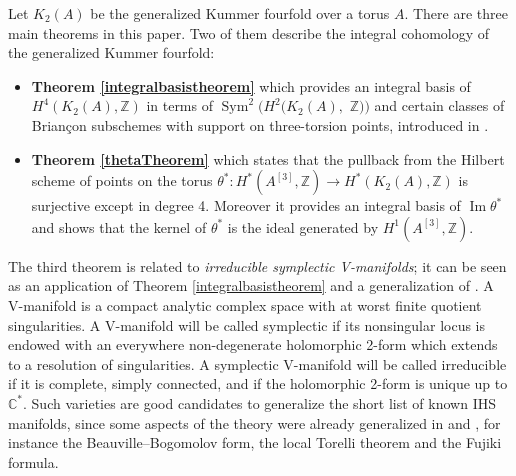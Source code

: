 \documentclass{alggeom}
\DeclareMathOperator{\im}{Im}
\DeclareMathOperator{\Sym}{Sym}
\newcommand{\hilb}[1]{^{[#1]}}
\newcommand{\kum}[2]{K_{ #2 }( #1 )}
\newcommand{\Z}{\mathbb{Z}}
\theoremstyle{plain}
\theoremstyle{definition}
\theoremstyle{remark}
\begin{document}
Let $\kum{A}{2}$ be the generalized Kummer fourfold over a torus $A$. There are three main theorems in this paper. Two of them describe the integral cohomology of the generalized Kummer fourfold:
\begin{itemize}
\item\textbf{Theorem \ref{integralbasistheorem}}
which provides an integral basis of $H^4(K_2(A),\Z)$ in terms of $\Sym^2(H^2(K_2(A),$
$\Z))$ and certain classes of Brian\c con subschemes with support on three-torsion points, introduced in \cite{Hassett}.
\item\textbf{Theorem \ref{thetaTheorem}}
which states that the pullback from the Hilbert scheme of points on the torus $\theta^*:H^{*}(A^{[3]},\Z)\rightarrow H^{*}(K_2(A),\Z)$ is surjective except in degree 4. Moreover it provides an integral basis of $\im \theta^*$ 
and shows that the kernel of $\theta^*$ is the ideal generated by $H^1(A\hilb{3},\Z)$.
\end{itemize}


The third theorem is related to \emph{irreducible symplectic V-manifolds}; it can be seen as an application of Theorem \ref{integralbasistheorem} and a generalization of \cite{Lol2}. A V-manifold is a compact analytic complex space with at worst finite quotient singularities. A V-manifold will be called symplectic if its nonsingular locus is endowed with an everywhere non-degenerate holomorphic 2-form which extends to a resolution of singularities. 
A symplectic V-manifold will be called irreducible if it is complete, simply connected, and if the holomorphic 2-form is unique up to $\mathbb{C}^*$. Such varieties are good candidates to generalize the short list of known IHS manifolds, since some aspects of the theory were already generalized in \cite{Nanikawa} and \cite{Mat}, for instance the Beauville--Bogomolov form, the local Torelli theorem and the Fujiki formula. 
\end{document}

